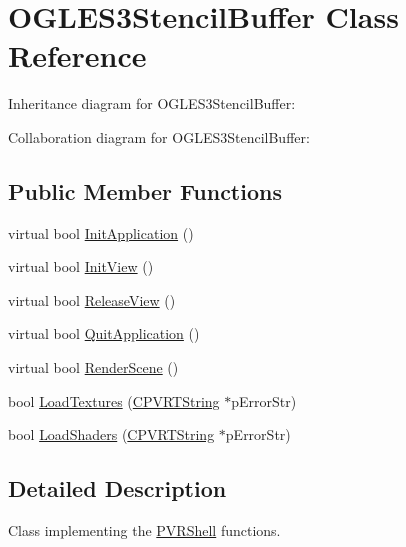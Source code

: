 \hypertarget{class_o_g_l_e_s3_stencil_buffer}{\section{O\+G\+L\+E\+S3\+Stencil\+Buffer Class Reference}
\label{class_o_g_l_e_s3_stencil_buffer}
}


Inheritance diagram for O\+G\+L\+E\+S3\+Stencil\+Buffer\+:


Collaboration diagram for O\+G\+L\+E\+S3\+Stencil\+Buffer\+:
\subsection*{Public Member Functions}
\begin{DoxyCompactItemize}
\item 
virtual bool \hyperlink{class_o_g_l_e_s3_stencil_buffer_a8f2dd34f9bfb7788f2ee3af828656527}{Init\+Application} ()
\item 
virtual bool \hyperlink{class_o_g_l_e_s3_stencil_buffer_a93c5e6c3e8caf7eed9f424410ae0c5da}{Init\+View} ()
\item 
virtual bool \hyperlink{class_o_g_l_e_s3_stencil_buffer_a8c7aead3a329f976e034365fcbae2ca7}{Release\+View} ()
\item 
virtual bool \hyperlink{class_o_g_l_e_s3_stencil_buffer_a7d532e2d2abb9d2d1e29e4b26f30dadc}{Quit\+Application} ()
\item 
virtual bool \hyperlink{class_o_g_l_e_s3_stencil_buffer_af5cc24685ad3c361fe7db05e42dbb17d}{Render\+Scene} ()
\item 
bool \hyperlink{class_o_g_l_e_s3_stencil_buffer_a134f9a3393a41a6bc246fe90d7ca223a}{Load\+Textures} (\hyperlink{class_c_p_v_r_t_string}{C\+P\+V\+R\+T\+String} $\ast$p\+Error\+Str)
\item 
bool \hyperlink{class_o_g_l_e_s3_stencil_buffer_ae626173886dcfe4ef0620c6e3b7d9593}{Load\+Shaders} (\hyperlink{class_c_p_v_r_t_string}{C\+P\+V\+R\+T\+String} $\ast$p\+Error\+Str)
\end{DoxyCompactItemize}


\subsection{Detailed Description}


 Class implementing the \hyperlink{class_p_v_r_shell}{P\+V\+R\+Shell} functions. 

